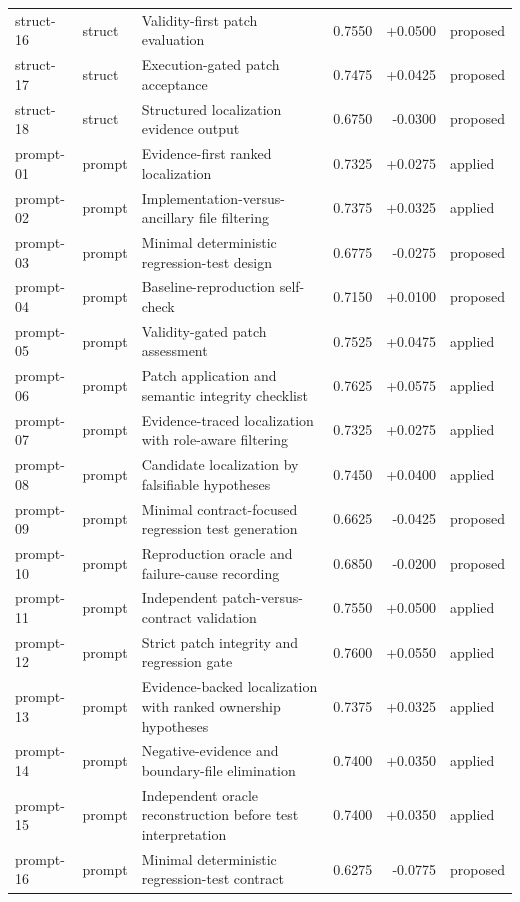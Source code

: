 \begin{center}
\begin{longtable}{llp{5.2cm}rrl}
struct-16 & struct & Validity-first patch evaluation & 0.7550 & +0.0500 & proposed \\
struct-17 & struct & Execution-gated patch acceptance & 0.7475 & +0.0425 & proposed \\
struct-18 & struct & Structured localization evidence output & 0.6750 & -0.0300 & proposed \\
prompt-01 & prompt & Evidence-first ranked localization & 0.7325 & +0.0275 & applied \\
prompt-02 & prompt & Implementation-versus-ancillary file filtering & 0.7375 & +0.0325 & applied \\
prompt-03 & prompt & Minimal deterministic regression-test design & 0.6775 & -0.0275 & proposed \\
prompt-04 & prompt & Baseline-reproduction self-check & 0.7150 & +0.0100 & proposed \\
prompt-05 & prompt & Validity-gated patch assessment & 0.7525 & +0.0475 & applied \\
prompt-06 & prompt & Patch application and semantic integrity checklist & 0.7625 & +0.0575 & applied \\
prompt-07 & prompt & Evidence-traced localization with role-aware filtering & 0.7325 & +0.0275 & applied \\
prompt-08 & prompt & Candidate localization by falsifiable hypotheses & 0.7450 & +0.0400 & applied \\
prompt-09 & prompt & Minimal contract-focused regression test generation & 0.6625 & -0.0425 & proposed \\
prompt-10 & prompt & Reproduction oracle and failure-cause recording & 0.6850 & -0.0200 & proposed \\
prompt-11 & prompt & Independent patch-versus-contract validation & 0.7550 & +0.0500 & applied \\
prompt-12 & prompt & Strict patch integrity and regression gate & 0.7600 & +0.0550 & applied \\
prompt-13 & prompt & Evidence-backed localization with ranked ownership hypotheses & 0.7375 & +0.0325 & applied \\
prompt-14 & prompt & Negative-evidence and boundary-file elimination & 0.7400 & +0.0350 & applied \\
prompt-15 & prompt & Independent oracle reconstruction before test interpretation & 0.7400 & +0.0350 & applied \\
prompt-16 & prompt & Minimal deterministic regression-test contract & 0.6275 & -0.0775 & proposed \\

\end{longtable}
\end{center}
